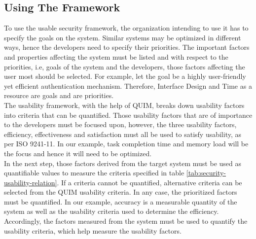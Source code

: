 \subsection{Using The Framework}
To use the usable security framework, the organization intending to use it has to specify the goals on the system. Similar systems may be optimized in different ways, hence the developers need to specify their priorities. The important factors and properties affecting the system must be listed and with respect to the priorities, i.e, goals of the system and the developers, those factors affecting the user most should be selected. For example, let the goal be a highly user-friendly yet efficient authentication mechanism. Therefore, Interface Design and Time as a resource are goals and are priorities.\\
The usability framework, with the help of QUIM, breaks down usability factors into criteria that can be quantified. Those usability factors that are of importance to the developers must be focused upon, however, the three usability factors, efficiency, effectiveness and satisfaction must all be used to satisfy usability, as per ISO 9241-11. In our example, task completion time and memory load will be the focus and hence it will need to be optimized.\\
In the next step, those factors derived from the target system must be used as quantifiable values to measure the criteria specified in table \ref{tab:security-usability-relation}. If a criteria cannot be quantified, alternative criteria can be selected from the QUIM usability criteria. In any case, the prioritized factors must be quantified. In our example, accuracy is a measurable quantity of the system as well as the usability criteria used to determine the efficiency.\\
Accordingly, the factors measured from the system must be used to quantify the usability criteria, which help measure the usability factors. 

